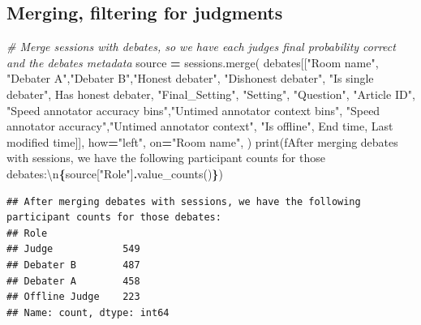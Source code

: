 \documentclass[
]{article}
\newenvironment{Shaded}{\begin{snugshade}}{\end{snugshade}}
\newcommand{\BuiltInTok}[1]{#1}
\newcommand{\CharTok}[1]{\textcolor[rgb]{0.31,0.60,0.02}{#1}}
\newcommand{\CommentTok}[1]{\textcolor[rgb]{0.56,0.35,0.01}{\textit{#1}}}
\newcommand{\NormalTok}[1]{#1}
\newcommand{\OperatorTok}[1]{\textcolor[rgb]{0.81,0.36,0.00}{\textbf{#1}}}
\newcommand{\SpecialCharTok}[1]{\textcolor[rgb]{0.81,0.36,0.00}{\textbf{#1}}}
\newcommand{\SpecialStringTok}[1]{\textcolor[rgb]{0.31,0.60,0.02}{#1}}
\newcommand{\StringTok}[1]{\textcolor[rgb]{0.31,0.60,0.02}{#1}}
\begin{document}
\subsection{Merging, filtering for
judgments}\label{merging-filtering-for-judgments}

\begin{Shaded}
\begin{Highlighting}[]
\CommentTok{\# Merge sessions with debates, so we have each judge\textquotesingle{}s final probability correct and the debate\textquotesingle{}s metadata}
\NormalTok{source }\OperatorTok{=}\NormalTok{ sessions.merge(}
\NormalTok{        debates[[}\StringTok{"Room name"}\NormalTok{, }\StringTok{"Debater A"}\NormalTok{,}\StringTok{"Debater B"}\NormalTok{,}\StringTok{"Honest debater"}\NormalTok{, }\StringTok{"Dishonest debater"}\NormalTok{,}
                 \StringTok{"Is single debater"}\NormalTok{, }\StringTok{\textquotesingle{}Has honest debater\textquotesingle{}}\NormalTok{,}
                 \StringTok{"Final\_Setting"}\NormalTok{, }\StringTok{"Setting"}\NormalTok{,}
                 \StringTok{"Question"}\NormalTok{, }\StringTok{"Article ID"}\NormalTok{,}
                 \StringTok{"Speed annotator accuracy bins"}\NormalTok{,}\StringTok{"Untimed annotator context bins"}\NormalTok{,}
                 \StringTok{"Speed annotator accuracy"}\NormalTok{,}\StringTok{"Untimed annotator context"}\NormalTok{, }\StringTok{"Is offline"}\NormalTok{,}
                 \StringTok{\textquotesingle{}End time\textquotesingle{}}\NormalTok{, }\StringTok{\textquotesingle{}Last modified time\textquotesingle{}}\NormalTok{]],}
\NormalTok{        how}\OperatorTok{=}\StringTok{"left"}\NormalTok{,}
\NormalTok{        on}\OperatorTok{=}\StringTok{"Room name"}\NormalTok{,}
\NormalTok{    )}
\BuiltInTok{print}\NormalTok{(}\SpecialStringTok{f\textquotesingle{}After merging debates with sessions, we have the following participant counts for those debates:}\CharTok{\textbackslash{}n}\SpecialCharTok{\{}\NormalTok{source[}\StringTok{"Role"}\NormalTok{]}\SpecialCharTok{.}\NormalTok{value\_counts()}\SpecialCharTok{\}}\SpecialStringTok{\textquotesingle{}}\NormalTok{) }
\end{Highlighting}
\end{Shaded}

\begin{verbatim}
## After merging debates with sessions, we have the following participant counts for those debates:
## Role
## Judge            549
## Debater B        487
## Debater A        458
## Offline Judge    223
## Name: count, dtype: int64
\end{verbatim}
\end{document}
